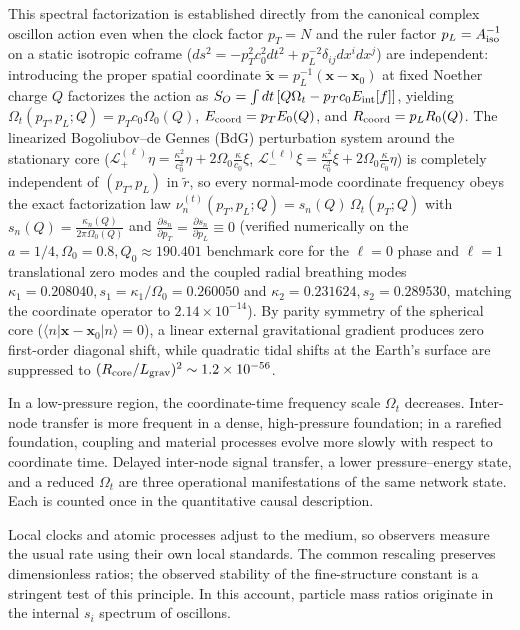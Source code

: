 \documentclass[11pt,a4paper]{article}
\begin{document}
This spectral factorization is established directly from the canonical complex oscillon action even when the clock factor $p_T = N$ and the ruler factor $p_L = A_{\rm iso}^{-1}$ on a static isotropic coframe ($ds^2 = -p_T^2 c_0^2 dt^2 + p_L^{-2}\delta_{ij}dx^i dx^j$) are independent: introducing the proper spatial coordinate $\tilde{\mathbf{x}} = p_L^{-1}(\mathbf{x}-\mathbf{x}_0)$ at fixed Noether charge $Q$ factorizes the action as $S_O = \int dt\,[Q\Omega_t - p_T c_0 E_{\rm int}[f]]$, yielding $\Omega_t(p_T, p_L; Q) = p_T c_0\Omega_0(Q)$, $E_{\rm coord} = p_T E_0(Q)$, and $R_{\rm coord} = p_L R_0(Q)$. The linearized Bogoliubov--de Gennes (BdG) perturbation system around the stationary core ($\mathcal{L}_+^{(\ell)}\eta = \frac{\kappa^2}{c_0^2}\eta + 2\Omega_0\frac{\kappa}{c_0}\xi$, $\mathcal{L}_-^{(\ell)}\xi = \frac{\kappa^2}{c_0^2}\xi + 2\Omega_0\frac{\kappa}{c_0}\eta$) is completely independent of $(p_T, p_L)$ in $\tilde{r}$, so every normal-mode coordinate frequency obeys the exact factorization law $\nu_n^{(t)}(p_T, p_L; Q) = s_n(Q)\,\Omega_t(p_T; Q)$ with $s_n(Q) = \frac{\kappa_n(Q)}{2\pi\Omega_0(Q)}$ and $\frac{\partial s_n}{\partial p_T} = \frac{\partial s_n}{\partial p_L} \equiv 0$ (verified numerically on the $a=1/4, \Omega_0=0.8, Q_0 \approx 190.401$ benchmark core for the $\ell=0$ phase and $\ell=1$ translational zero modes and the coupled radial breathing modes $\kappa_1 = 0.208040, s_1 = \kappa_1/\Omega_0 = 0.260050$ and $\kappa_2 = 0.231624, s_2 = 0.289530$, matching the coordinate operator to $2.14\times 10^{-14}$). By parity symmetry of the spherical core ($\langle n | \mathbf{x}-\mathbf{x}_0 | n\rangle = 0$), a linear external gravitational gradient produces zero first-order diagonal shift, while quadratic tidal shifts at the Earth's surface are suppressed to $(R_{\rm core}/L_{\rm grav})^2 \sim 1.2\times 10^{-56}$.

In a low-pressure region, the coordinate-time frequency scale $\Omega_t$ decreases. Inter-node transfer is more frequent in a dense, high-pressure foundation; in a rarefied foundation, coupling and material processes evolve more slowly with respect to coordinate time. Delayed inter-node signal transfer, a lower pressure--energy state, and a reduced $\Omega_t$ are three operational manifestations of the same network state. Each is counted once in the quantitative causal description.

Local clocks and atomic processes adjust to the medium, so observers measure the usual rate using their own local standards. The common rescaling preserves dimensionless ratios; the observed stability of the fine-structure constant is a stringent test of this principle. In this account, particle mass ratios originate in the internal $s_i$ spectrum of oscillons.
\end{document}
